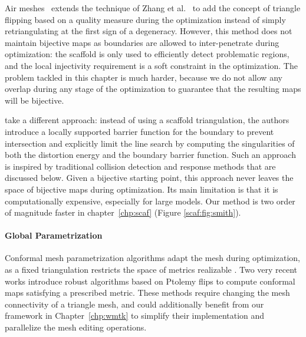 Air meshes~\cite{Muller:2015} extends the technique of Zhang et al.~\cite{Zhang:2005} to add the concept of triangle flipping based on a quality measure during the optimization instead of simply retriangulating at the first sign of a degeneracy. However, this method does not maintain bijective maps as boundaries are allowed to inter-penetrate during optimization: the scaffold is only used to efficiently detect problematic regions, and the local injectivity requirement is a soft constraint in the optimization. The problem tackled in this chapter is much harder, because we do not allow any overlap during any stage of the optimization to guarantee that the resulting maps will be bijective.

\citep{Smith:2015} take a different approach: instead of using a scaffold triangulation, the authors introduce a locally supported barrier function for the boundary to prevent intersection and explicitly limit the line search by computing the singularities of both the distortion energy and the boundary barrier function. Such an approach is inspired by traditional collision detection and response methods that are discussed below. Given a  bijective starting point, this approach never leaves the space of bijective maps during optimization.  Its main limitation is that it is computationally expensive, especially for large models. Our method is two order of magnitude faster in chapter~\ref{chp:scaf} (Figure \ref{scaf:fig:smith}).

\paragraph{Global Parametrization} 

Conformal mesh parametrization algorithms adapt the mesh during optimization, as a fixed triangulation restricts the space of metrics realizable \cite{luo2004combinatorial,Campen:2017:SimilarityMaps,campen2018seamless,gu2018discrete,gu2018discrete2,springborn2019ideal,sun2015discrete}. Two very recent works \cite{Gillespie:2021:DCE,Campen:2021} introduce robust algorithms based on Ptolemy flips to compute conformal maps satisfying a prescribed metric. These methods require changing the mesh connectivity of a triangle mesh, and could additionally benefit from our framework in Chapter~\ref{chp:wmtk} to simplify their implementation and parallelize the mesh editing operations. 

